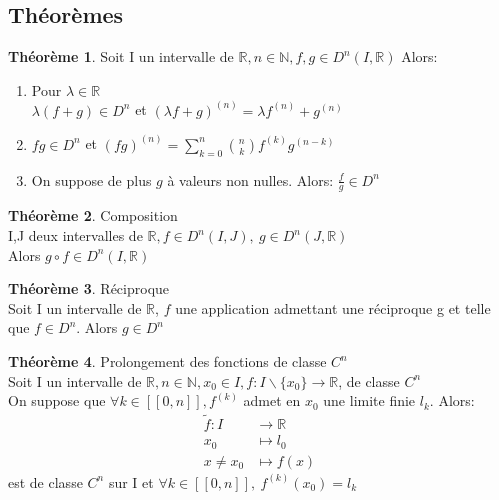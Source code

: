 \documentclass[fleqn]{article}
\theoremstyle{definition} \newtheorem*{defi}{D\'efinition}
\theoremstyle{definition} \newtheorem*{theo}{Th\'eor\`eme}
\theoremstyle{remark} \newtheorem*{rqs}{Remarques}
\theoremstyle{definition} \newtheorem*{prop}{Propri\'et\'e}
\begin{document}
\subsection{Th\'eor\`emes}
\begin{theo}
	Soit I un intervalle de $\mathbb{R}, n \in \mathbb{N}, f,g \in D^n(I, \mathbb{R})$ Alors:
	\begin{enumerate}
		\item Pour $\lambda \in \mathbb{R}$ \\
			$\lambda (f + g) \in D^n$ et $(\lambda f + g)^{(n)} = \lambda f^{(n)} + g^{(n)}$
		\item $fg \in D^n$ et $(fg)^{(n)} = \sum_{k=0}^{n} \binom{n}{k} f^{(k)} g ^{(n-k)}$
		\item On suppose de plus $g$ \`a valeurs non nulles. Alors: $\frac{f}{g} \in D^n$
	\end{enumerate}
\end{theo}

\begin{theo} Composition\\
	I,J deux intervalles de $\mathbb{R}, f \in D^n(I, J),\ g \in D^n(J, \mathbb{R})$\\
	Alors $g \circ f \in D^n(I, \mathbb{R})$
\end{theo}

\begin{theo} R\'eciproque\\
	Soit I un intervalle de $\mathbb{R}$, $f$ une application admettant une r\'eciproque g et telle que $f \in D^n$. Alors $g \in D^n$
\end{theo}

\begin{theo} Prolongement des fonctions de classe $C^n$\\
	Soit I un intervalle de $\mathbb{R}, n \in \mathbb{N}, x_0 \in I, f:I\backslash\{x_0\} \rightarrow \mathbb{R}$, de classe $C^n$ \\
	On suppose que $\forall k \in [\![0,n]\!], f^{(k)}$ admet en $x_0$ une limite finie $l_k$. Alors:
	\begin{align*}
		\tilde{f}: I &\rightarrow \mathbb{R}\\
		x_0 &\mapsto l_0\\
		x \neq x_0 &\mapsto f(x)
	\end{align*}
	est de classe $C^n$ sur I et $\forall k \in [\![0,n]\!],\ f^{(k)}(x_0) = l_k$
\end{theo}

\end{document}
